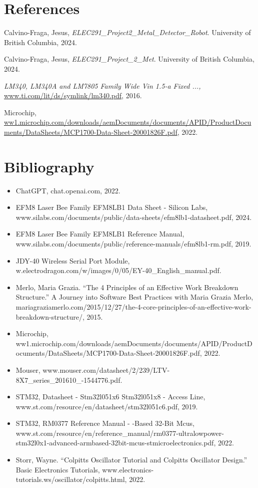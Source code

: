 \documentclass{article}
\begin{document}
\section{References}
\vspace{-2\baselineskip} %
\begin{thebibliography}{10}
     Calvino-Fraga, Jesus, \textit{ELEC291\_Project2\_Metal\_Detector\_Robot}. University of British Columbia, 2024.

     Calvino-Fraga, Jesus, \textit{ELEC291\_Project\_2\_Met}. University of British Columbia, 2024.

     \textit{LM340, LM340A and LM7805 Family Wide Vin 1.5-a Fixed ...,} \url{www.ti.com/lit/ds/symlink/lm340.pdf}, 2016.

     Microchip, \url{ww1.microchip.com/downloads/aemDocuments/documents/APID/ProductDocuments/DataSheets/MCP1700-Data-Sheet-20001826F.pdf}, 2022.

\end{thebibliography}

\section{Bibliography}
\begin{itemize}
    \item ChatGPT, chat.openai.com, 2022.
    \item EFM8 Laser Bee Family EFM8LB1 Data Sheet - Silicon Labs, www.silabs.com/documents/public/data-sheets/efm8lb1-datasheet.pdf, 2024.
    \item EFM8 Laser Bee Family EFM8LB1 Reference Manual, www.silabs.com/documents/public/reference-manuals/efm8lb1-rm.pdf, 2019.
    \item JDY-40 Wireless Serial Port Module, w.electrodragon.com/w/images/0/05/EY-40\_English\_manual.pdf.
    \item Merlo, Maria Grazia. “The 4 Principles of an Effective Work Breakdown Structure.” A Journey into Software Best Practices with Maria Grazia Merlo, mariagraziamerlo.com/2015/12/27/the-4-core-principles-of-an-effective-work-breakdown-structure/, 2015.
    \item Microchip, ww1.microchip.com/downloads/aemDocuments/documents/APID/ProductDocuments/DataSheets/MCP1700-Data-Sheet-20001826F.pdf, 2022.
    \item Mouser, www.mouser.com/datasheet/2/239/LTV-8X7\_series\_201610\_-1544776.pdf.
    \item STM32, Datasheet - Stm32l051x6 Stm32l051x8 - Access Line, www.st.com/resource/en/datasheet/stm32l051c6.pdf, 2019.
    \item STM32, RM0377 Reference Manual - -Based 32-Bit Mcus, www.st.com/resource/en/reference\_manual/rm0377-ultralowpower-stm32l0x1-advanced-armbased-32bit-mcus-stmicroelectronics.pdf, 2022.
    \item Storr, Wayne. “Colpitts Oscillator Tutorial and Colpitts Oscillator Design.” Basic Electronics Tutorials, www.electronics-tutorials.ws/oscillator/colpitts.html, 2022.
\end{itemize}
\end{document}
